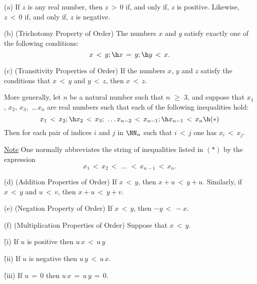 \V


        (a) If $z$ is any real number, then $z\,>\,0$ if, and only if, $z$ is positive.
    Likewise, $z\,<\,0$ if, and only if, $z$ is negative.


\V

        (b) (Trichotomy Property of Order) The numbers $x$ and $y$ satisfy exactly one of the following conditions:
        \begin{displaymath}
        x\,<\,y; \h  x \,=\, y; \h y\,<\,x.
        \end{displaymath}

\V

        (c) (Transitivity Properties of Order) If the numbers $x$, $y$ and $z$ satisfy the conditions that $x\,<\,y$ and $y\,<\,z$, then $x\,<\,z$.

        More generally, let $n$ be a natural number such that $n\,\,{\geq}\,\,3$,
    and suppose that $x_{1}$, $x_{2}$, $x_{3}$, \,{\ldots}\,$x_{n}$ are real numbers such that each of the following inequalities hold:
        \begin{displaymath}
        x_{1}\,<\,x_{2}; \h x_{2}\,<\,x_{3};
    \,\,{\ldots}\,
        x_{n-2}\,<\,x_{n-1};\h x_{n-1}\,<\,x_{n} \h ({\ast})
        \end{displaymath}
    Then for each pair of indices $i$ and $j$ in ${\NN}_{n}$ such that $i\,<\,j$ one has $x_{i}\,<\,x_{j}$.

        \underline{Note} One normally abbreviates the string of inequalities listed in $({\ast})$ by the expression
        \begin{displaymath}
        x_{1}\,<\,x_{2}\,<\,\,{\ldots}\,\,<\,x_{n-1}\,<\,x_{n}.
        \end{displaymath}

\V

        (d) (Addition Properties of Order) If $x\,<\,y$, then $x+u\,<\,y+u$. Similarly, if $x\,<\,y$ and $u\,<\,v$, then $x+u\,<\,y+v$.

\V

        (e) (Negation Property of Order) If $x\,<\,y$, then $-y\,<\,-x$.

\V

        (f) (Multiplication Properties of Order) Suppose that $x\,<\,y$.

        \h (i) If $u$ is positive then $u\,x\,<\,u\,y$

        \h (ii) If $u$ is negative then $u\,y\,<\,u\,x$.

        \h (iii) If $u \,=\, 0$ then $u\,x \,=\, u\,y \,=\, 0$.


